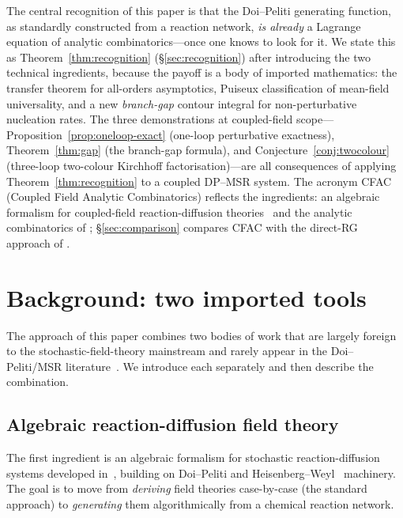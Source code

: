 \documentclass[11pt,a4paper]{article}
\theoremstyle{plain}
\begin{document}
The central recognition of this paper is that the Doi--Peliti
generating function, as standardly constructed from a reaction
network, \emph{is already} a Lagrange equation of analytic
combinatorics---once one knows to look for it.  We state this as
Theorem~\ref{thm:recognition} (\S\ref{sec:recognition}) after
introducing the two technical ingredients, because the payoff is
a body of imported mathematics: the transfer theorem for
all-orders asymptotics, Puiseux classification of mean-field
universality, and a new \emph{branch-gap} contour integral for
non-perturbative nucleation rates.  The three demonstrations at
coupled-field scope---Proposition~\ref{prop:oneloop-exact}
(one-loop perturbative exactness), Theorem~\ref{thm:gap} (the
branch-gap formula), and Conjecture~\ref{conj:twocolour} (three-loop
two-colour Kirchhoff factorisation)---are all consequences of
applying Theorem~\ref{thm:recognition} to a coupled DP--MSR
system.  The acronym CFAC (Coupled Field Analytic Combinatorics)
reflects the ingredients: an algebraic formalism for coupled-field
reaction-diffusion theories~\citep{Amarteifio2019Thesis} and the
analytic combinatorics of \citet{FlajoletSedgewick};
\S\ref{sec:comparison} compares CFAC with the direct-RG approach
of \citet{PruessnerGarciaMillan2025}.

\section{Background: two imported tools}
\label{sec:background}

The approach of this paper combines two bodies of work that are
largely foreign to the stochastic-field-theory mainstream and
rarely appear in the Doi--Peliti/MSR
literature~\cite{PruessnerGarciaMillan2025,Bothe2023,Tauber}.  We
introduce each separately and then describe the combination.

\subsection{Algebraic reaction-diffusion field theory}
\label{sec:algebraic}

The first ingredient is an algebraic formalism for stochastic
reaction-diffusion systems developed
in~\cite{Amarteifio2019Thesis}, building on Doi--Peliti
\cite{Doi1976,Peliti1985} and
Heisenberg--Weyl~\cite{Tauber} machinery.  The goal is to move
from \emph{deriving} field theories case-by-case (the standard
approach) to \emph{generating} them algorithmically from a
chemical reaction network.
\end{document}
